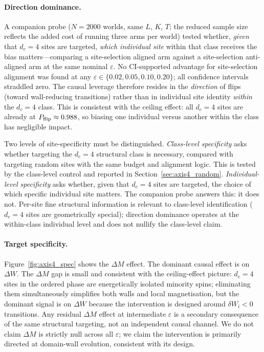 \documentclass[aps,pre,preprint,superscriptaddress,showpacs]{revtex4-2}
\begin{document}
\paragraph{Direction dominance.}
A companion probe ($N=2000$ worlds, same $L$, $K$, $T$; the reduced
sample size reflects the added cost of running three arms per world)
tested whether, \emph{given} that $d_c=4$ sites are targeted,
\emph{which individual site} within that class receives the bias
matters---comparing a site-selection aligned arm against a site-selection
anti-aligned arm at the same nominal $\varepsilon$.
No CI-supported advantage for site-selection alignment was found at any
$\varepsilon \in \{0.02, 0.05, 0.10, 0.20\}$; all confidence intervals
straddled zero.
The causal leverage therefore resides in the \emph{direction} of flips
(toward wall-reducing transitions) rather than in individual site identity
\emph{within} the $d_c=4$ class.
This is consistent with the ceiling effect: all $d_c=4$ sites are already
at $P_{\rm flip}\approx0.988$, so biasing one individual versus another
within the class has negligible impact.

Two levels of site-specificity must be distinguished.
\emph{Class-level specificity} asks whether targeting the $d_c=4$
structural class is necessary, compared with targeting random sites
with the same budget and alignment logic.
This is tested by the class-level control and reported in Section~\ref{sec:axis4_random}.
\emph{Individual-level specificity} asks whether, given that $d_c=4$
sites are targeted, the choice of which specific individual site matters.
The companion probe answers this: it does not.
Per-site fine structural information is relevant to class-level
identification ($d_c=4$ sites are geometrically special); direction
dominance operates at the within-class individual level and does not
nullify the class-level claim.

\paragraph{Target specificity.}
Figure~\ref{fig:axis4_spec} shows the $\Delta M$ effect.
The dominant causal effect is on $\Delta W$.
The $\Delta M$ gap is small and consistent with the ceiling-effect picture:
$d_c=4$ sites in the ordered phase are energetically isolated minority
spins; eliminating them simultaneously simplifies both walls and local
magnetisation, but the dominant signal is on $\Delta W$ because the
intervention is designed around $\delta W_i < 0$ transitions.
Any residual $\Delta M$ effect at intermediate $\varepsilon$ is a secondary
consequence of the same structural targeting, not an independent causal
channel.
We do not claim $\Delta M$ is strictly null across all $\varepsilon$;
we claim the intervention is primarily directed at domain-wall evolution,
consistent with its design.
\end{document}
